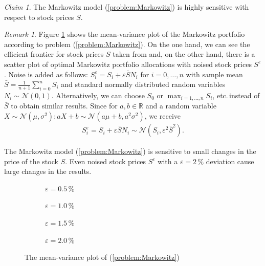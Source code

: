 \documentclass[a4paper, english, 11pt, onecolumn, oneside, final]{article}
\numberwithin{equation}{section}   %
\newcommand{\R}{\mathbb{R}}                 %
\theoremstyle{plain}
\theoremstyle{definition}
\theoremstyle{remark}
\newtheorem{remark}     [theorem]{Remark}
\newtheorem{claim}      [theorem]{Claim}
\begin{document}
\begin{claim}
    The Markowitz model (\ref{problem:Markowitz}) is highly sensitive with respect to stock prices $S$.
\end{claim}
\begin{remark} \label{remark:meanVariancePlotMarkowitz}
    Figure \ref{fig:plotMeanVarianceMarkowitz} shows the mean-variance plot of the Markowitz portfolio according to problem (\ref{problem:Markowitz}). On the one hand, we can see the efficient frontier for stock prices $S$ taken from \cite[p.~18]{PichlerPortfoliooptimierung} and, on the other hand, there is a scatter plot of optimal Markowitz portfolio allocations with noised stock prices $S^\varepsilon$. Noise is added as follows: $S^\varepsilon_i=S_i+\varepsilon\bar{S}N_i$ for $i=0,\ldots,n$ with sample mean $\bar{S} = \frac{1}{n+1}\sum_{i=0}^nS_i$ and standard normally distributed random variables $N_i\sim\mathcal{N}(0,1)$. Alternatively, we can choose $S_0$ or $\max_{i=1,\ldots,n}S_i$, etc.\,instead of $\bar{S}$ to obtain similar results. Since for $a,b\in\R$ and a random variable $X\sim\mathcal{N}(\mu,\sigma^2):aX+b\sim\mathcal{N}(a\mu+b, a^2\sigma^2)$, we receive
    \begin{equation*}
        \begin{aligned}
            S^\varepsilon_i=S_i+\varepsilon\bar{S}N_i\sim\mathcal{N}(S_i,\varepsilon^2\bar{S}^2).
        \end{aligned}
    \end{equation*}
    
    The Markowitz model (\ref{problem:Markowitz}) is sensitive to small changes in the price of the stock $S$. Even noised stock prices $S^\varepsilon$ with a $\varepsilon=2\,\%$ deviation cause large changes in the results.
\end{remark}
\begin{figure}[h]
\centering
    \begin{subfigure}{0.5\linewidth}
    
    \caption{$\varepsilon = 0.5\,\%$}
    \end{subfigure}\hfill
    \begin{subfigure}{0.5\linewidth}
    
    \caption{$\varepsilon = 1.0\,\%$}
    \end{subfigure}

    \begin{subfigure}{0.5\linewidth}
    
    \caption{$\varepsilon = 1.5\,\%$}
    \end{subfigure}\hfill
    \begin{subfigure}{0.5\linewidth}
    
    \caption{$\varepsilon = 2.0\,\%$}
    \end{subfigure}
\caption{The mean-variance plot of (\ref{problem:Markowitz})}
\label{fig:plotMeanVarianceMarkowitz}
\end{figure}
\newpage
\end{document}
